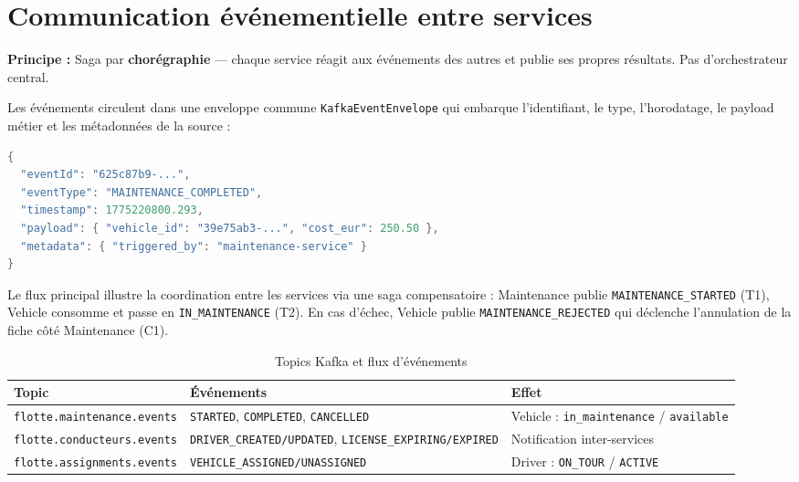 \documentclass[12pt,a4paper]{article}
\begin{document}
\newpage
\section{Communication \'{e}v\'{e}nementielle entre services}

\begin{infobox}
\textbf{Principe :} Saga par \textbf{chor\'{e}graphie} --- chaque service r\'{e}agit aux \'{e}v\'{e}nements des autres et publie ses propres r\'{e}sultats. Pas d'orchestrateur central.
\end{infobox}

Les \'{e}v\'{e}nements circulent dans une enveloppe commune \texttt{KafkaEventEnvelope} qui embarque l'identifiant, le type, l'horodatage, le payload m\'{e}tier et les m\'{e}tadonn\'{e}es de la source :

\begin{lstlisting}[language=java, caption=Enveloppe \'{e}v\'{e}nement unifi\'{e}e]
{
  "eventId": "625c87b9-...",
  "eventType": "MAINTENANCE_COMPLETED",
  "timestamp": 1775220800.293,
  "payload": { "vehicle_id": "39e75ab3-...", "cost_eur": 250.50 },
  "metadata": { "triggered_by": "maintenance-service" }
}
\end{lstlisting}

Le flux principal illustre la coordination entre les services via une saga compensatoire : Maintenance publie \texttt{MAINTENANCE\_STARTED} (T1), Vehicle consomme et passe en \texttt{IN\_MAINTENANCE} (T2). En cas d'\'{e}chec, Vehicle publie \texttt{MAINTENANCE\_REJECTED} qui d\'{e}clenche l'annulation de la fiche c\^{o}t\'{e} Maintenance (C1).

\begin{table}[H]
\centering\small
\begin{tabular}{|l|l|p{6cm}|}
  \hline
  \rowcolor{primary!15}
  \textbf{Topic} & \textbf{\'{E}v\'{e}nements} & \textbf{Effet} \\
  \hline
  \texttt{flotte.maintenance.events} & \texttt{STARTED}, \texttt{COMPLETED}, \texttt{CANCELLED} & Vehicle : \texttt{in\_maintenance} / \texttt{available} \\
  \hline
  \texttt{flotte.conducteurs.events} & \texttt{DRIVER\_CREATED/UPDATED}, \texttt{LICENSE\_EXPIRING/EXPIRED} & Notification inter-services \\
  \hline
  \texttt{flotte.assignments.events} & \texttt{VEHICLE\_ASSIGNED/UNASSIGNED} & Driver : \texttt{ON\_TOUR} / \texttt{ACTIVE} \\
  \hline
\end{tabular}
\caption{Topics Kafka et flux d'\'{e}v\'{e}nements}
\end{table}
\end{document}

